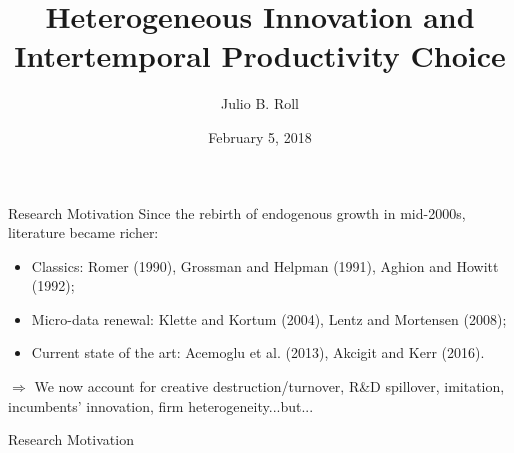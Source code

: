 \documentclass[11pt]{beamer}
\author{Julio B. Roll}
\title{Heterogeneous Innovation and Intertemporal Productivity Choice}
\date{February 5, 2018}
\begin{document}
\begin{frame}
	\maketitle
\end{frame}

\begin{frame}{Research Motivation}
	Since the rebirth of endogenous growth in mid-2000s, literature became richer:
	\begin{itemize}\itemsep12pt
	\item Classics: Romer (1990), Grossman and Helpman (1991), Aghion and Howitt (1992);
	\item Micro-data renewal: Klette and Kortum (2004), Lentz and Mortensen (2008);
	\item Current state of the art: Acemoglu et al. (2013), Akcigit and Kerr (2016).
	\end{itemize}
$\Rightarrow$ We now account for creative destruction/turnover, R\&D spillover, imitation, incumbents' innovation, firm heterogeneity...but...
\end{frame}


\begin{frame}{Research Motivation}
	\begin{center}
	\begin{figure}\centering\label{Ratio_firms}
	\end{figure}
	\end{center}
\end{frame}
\end{document}
